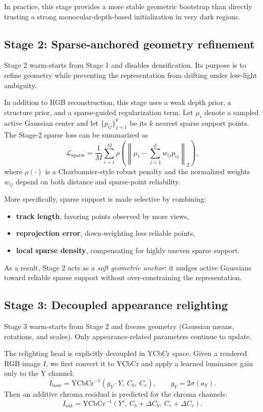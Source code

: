 \documentclass[10pt,a4paper]{article}
\begin{document}
In practice, this stage provides a more stable geometric bootstrap than directly trusting a strong monocular-depth-based initialization in very dark regions.

\subsection{Stage 2: Sparse-anchored geometry refinement}
Stage 2 warm-starts from Stage 1 and disables densification. Its purpose is to refine geometry while preventing the representation from drifting under low-light ambiguity.

In addition to RGB reconstruction, this stage uses a weak depth prior, a structure prior, and a sparse-guided regularization term. Let $\mu_i$ denote a sampled active Gaussian center and let $\{p_{ij}\}_{j=1}^{k}$ be its $k$ nearest sparse support points. The Stage-2 sparse loss can be summarized as
\begin{equation}
\mathcal{L}_{\text{sparse}} = \frac{1}{M}\sum_{i=1}^{M} \rho\!\left(\left\lVert \mu_i - \sum_{j=1}^{k} w_{ij} p_{ij} \right\rVert_2\right),
\end{equation}
where $\rho(\cdot)$ is a Charbonnier-style robust penalty and the normalized weights $w_{ij}$ depend on both distance and sparse-point reliability.

More specifically, sparse support is made selective by combining:
\begin{itemize}[leftmargin=2em]
  \item \textbf{track length}, favoring points observed by more views,
  \item \textbf{reprojection error}, down-weighting less reliable points,
  \item \textbf{local sparse density}, compensating for highly uneven sparse support.
\end{itemize}

As a result, Stage 2 acts as a \emph{soft geometric anchor}: it nudges active Gaussians toward reliable sparse support without over-constraining the representation.

\subsection{Stage 3: Decoupled appearance relighting}
Stage 3 warm-starts from Stage 2 and freezes geometry (Gaussian means, rotations, and scales). Only appearance-related parameters continue to update.

The relighting head is explicitly decoupled in YCbCr space. Given a rendered RGB image $I$, we first convert it to YCbCr and apply a learned luminance gain only to the Y channel:
\begin{equation}
I_{\text{base}} = \mathrm{YCbCr}^{-1}(g_Y \cdot Y,\ C_b,\ C_r), \qquad g_Y = 2\sigma(a_Y).
\end{equation}
Then an additive chroma residual is predicted for the chroma channels:
\begin{equation}
I_{\text{out}} = \mathrm{YCbCr}^{-1}(Y',\ C_b + \Delta C_b,\ C_r + \Delta C_r).
\end{equation}
\end{document}

